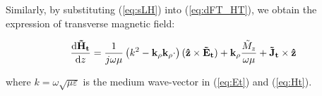 \documentclass[11pt]{article}
\renewcommand{\v}[1]{\mathbf{#1}} %
\newcommand{\ti}[1]{\tilde{#1}} %
\renewcommand{\O}{\omega}  %
\renewcommand{\u}{\mu}  %
\newcommand{\x}{\times}  %
\begin{document}
  Similarly, by substituting (\ref{eq:sLH}) into (\ref{eq:dFT_HT}), we obtain the expression of transverse magnetic field:

  \begin{equation}
    \dv{\v{\ti{H}_t}}{z} =
    \frac{1}{j \O \u} \left( k^2 - \v{k_{\rho}}\v{k_{\rho}} \cdot \right) (\v{\hat{z}} \x \v{\ti{E}_t}) + \v{k_{\rho}} \frac{\ti{M}_z}{\O \u} + \v{\ti{J}_t}
    \x \v{\hat{z}}
    \label{eq:Ht}
  \end{equation}

  where $k = \O \sqrt{\u \varepsilon}$ is the medium wave-vector in (\ref{eq:Et}) and (\ref{eq:Ht}).





  
  
\end{document}
